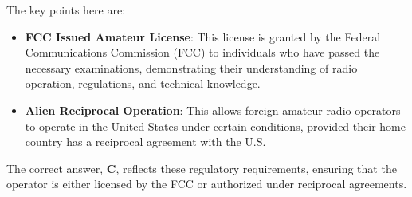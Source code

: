 The key points here are:
\begin{itemize}
    \item \textbf{FCC Issued Amateur License}: This license is granted by the Federal Communications Commission (FCC) to individuals who have passed the necessary examinations, demonstrating their understanding of radio operation, regulations, and technical knowledge.
    \item \textbf{Alien Reciprocal Operation}: This allows foreign amateur radio operators to operate in the United States under certain conditions, provided their home country has a reciprocal agreement with the U.S.
\end{itemize}

The correct answer, \textbf{C}, reflects these regulatory requirements, ensuring that the operator is either licensed by the FCC or authorized under reciprocal agreements.

